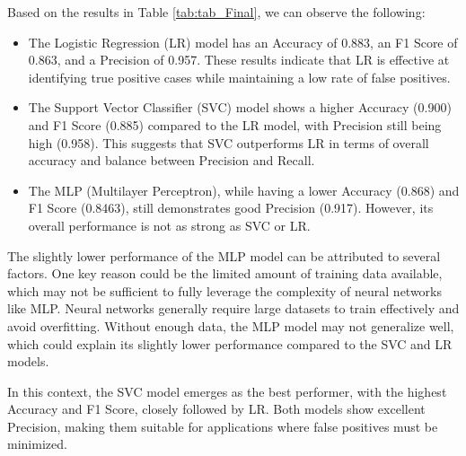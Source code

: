 Based on the results in Table \ref{tab:tab_Final}, we can observe the following:

\begin{itemize}
     \item The Logistic Regression (LR) model has an Accuracy of 0.883, an F1 Score of 0.863, and a Precision of 0.957. These results indicate that LR is effective at identifying true positive cases while maintaining a low rate of false positives.
    \item The Support Vector Classifier (SVC) model shows a higher Accuracy (0.900) and F1 Score (0.885) compared to the LR model, with Precision still being high (0.958). This suggests that SVC outperforms LR in terms of overall accuracy and balance between Precision and Recall.
    
    \item The MLP (Multilayer Perceptron), while having a lower Accuracy (0.868) and F1 Score (0.8463), still demonstrates good Precision (0.917). However, its overall performance is not as strong as SVC or LR.

\end{itemize}

The slightly lower performance of the MLP model can be attributed to several factors. One key reason could be the limited amount of training data available, which may not be sufficient to fully leverage the complexity of neural networks like MLP. Neural networks generally require large datasets to train effectively and avoid overfitting. Without enough data, the MLP model may not generalize well, which could explain its slightly lower performance compared to the SVC and LR models.

In this context, the SVC model emerges as the best performer, with the highest Accuracy and F1 Score, closely followed by LR. Both models show excellent Precision, making them suitable for applications where false positives must be minimized.